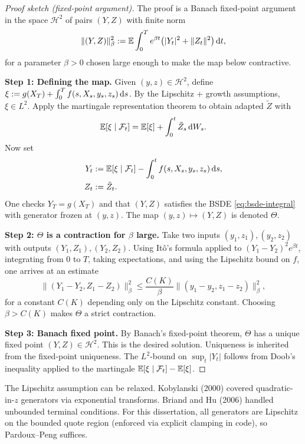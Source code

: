 \begin{proof}[Proof sketch (fixed-point argument)]
The proof is a Banach fixed-point argument in the space $\mathcal{H}^2$ of pairs $(Y, Z)$ with finite norm
\[
  \|(Y, Z)\|_\beta^2 := \mathbb{E}\int_0^T e^{\beta t}\bigl(|Y_t|^2 + \|Z_t\|^2\bigr) \, \mathrm{d} t,
\]
for a parameter $\beta > 0$ chosen large enough to make the map below contractive.

\textbf{Step 1: Defining the map.}
Given $(y, z) \in \mathcal{H}^2$, define $\xi := g(X_T) + \int_0^T f(s, X_s, y_s, z_s) \, \mathrm{d} s$. By the Lipschitz + growth assumptions, $\xi \in L^2$. Apply the martingale representation theorem to obtain adapted $\tilde Z$ with
\[
  \mathbb{E}[\xi \mid \mathcal{F}_t] = \mathbb{E}[\xi] + \int_0^t \tilde Z_s \, \mathrm{d} W_s.
\]
Now set
\begin{align}
  Y_t &:= \mathbb{E}[\xi \mid \mathcal{F}_t] - \int_0^t f(s, X_s, y_s, z_s) \, \mathrm{d} s, \\
  Z_t &:= \tilde Z_t.
\end{align}
One checks $Y_T = g(X_T)$ and that $(Y, Z)$ satisfies the BSDE \eqref{eq:bsde-integral} with generator frozen at $(y, z)$. The map $(y, z) \mapsto (Y, Z)$ is denoted $\Theta$.

\textbf{Step 2: $\Theta$ is a contraction for $\beta$ large.}
Take two inputs $(y_1, z_1), (y_2, z_2)$ with outputs $(Y_1, Z_1), (Y_2, Z_2)$. Using It\^o's formula applied to $(Y_1 - Y_2)^2 e^{\beta t}$, integrating from $0$ to $T$, taking expectations, and using the Lipschitz bound on $f$, one arrives at an estimate
\[
  \|(Y_1 - Y_2, Z_1 - Z_2)\|_\beta^2 \leq \frac{C(K)}{\beta} \|(y_1 - y_2, z_1 - z_2)\|_\beta^2,
\]
for a constant $C(K)$ depending only on the Lipschitz constant. Choosing $\beta > C(K)$ makes $\Theta$ a strict contraction.

\textbf{Step 3: Banach fixed point.}
By Banach's fixed-point theorem, $\Theta$ has a unique fixed point $(Y, Z) \in \mathcal{H}^2$. This is the desired solution. Uniqueness is inherited from the fixed-point uniqueness. The $L^2$-bound on $\sup_t |Y_t|$ follows from Doob's inequality applied to the martingale $\mathbb{E}[\xi \mid \mathcal{F}_t] - \mathbb{E}[\xi]$.
\end{proof}

\begin{remark}
The Lipschitz assumption can be relaxed. Kobylanski (2000) \cite{kobylanski2000} covered quadratic-in-$z$ generators via exponential transforms. Briand and Hu (2006) \cite{briand2006} handled unbounded terminal conditions. For this dissertation, all generators are Lipschitz on the bounded quote region (enforced via explicit clamping in code), so Pardoux--Peng suffices.
\end{remark}

